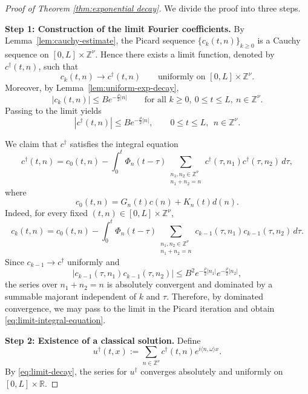 \documentclass[12pt,reqno,tbtags]{amsart}
\newcommand\1{\mathbbm{1}}
\begin{document}
\begin{proof}[Proof of Theorem \ref{thm:exponential decay}]
We divide the proof into three steps.

\medskip
\noindent
\textbf{Step 1: Construction of the limit Fourier coefficients.}
By Lemma~\ref{lem:cauchy-estimate}, the Picard sequence
$\{c_k(t,n)\}_{k\geq 0}$ is a Cauchy sequence on $[0,L]\times \mathbb{Z}^{\nu}$.
Hence there exists a limit function, denoted by $c^{\dagger}(t,n)$, such that
\[
c_k(t,n)\longrightarrow c^{\dagger}(t,n)
\qquad \text{uniformly on } [0,L]\times \mathbb{Z}^{\nu}.
\]
Moreover, by Lemma~\ref{lem:uniform-exp-decay},
\[
|c_k(t,n)|\leq B e^{-\frac{\rho}{2}|n|}
\qquad
\text{for all } k\geq 0,\ 0\leq t\leq L,\ n\in \mathbb{Z}^{\nu}.
\]
Passing to the limit yields
\begin{equation}\label{eq:limit-decay}
|c^{\dagger}(t,n)|\leq B e^{-\frac{\rho}{2}|n|},
\qquad
0\leq t\leq L,\ \ n\in \mathbb{Z}^{\nu}.
\end{equation}

We claim that $c^{\dagger}$ satisfies the integral equation
\begin{equation}\label{eq:limit-integral-equation}
c^{\dagger}(t,n)
=
c_0(t,n)
-
\int_0^t \Phi_n(t-\tau)
\sum_{\substack{n_1,n_2\in \mathbb{Z}^{\nu}\\ n_1+n_2=n}}
c^{\dagger}(\tau,n_1)c^{\dagger}(\tau,n_2)\,d\tau,
\end{equation}
where
\[
c_0(t,n)=G_n(t)c(n)+K_n(t)d(n).
\]
Indeed, for every fixed $(t,n)\in [0,L]\times \mathbb{Z}^{\nu}$,
\[
c_k(t,n)
=
c_0(t,n)
-
\int_0^t \Phi_n(t-\tau)
\sum_{\substack{n_1,n_2\in \mathbb{Z}^{\nu}\\ n_1+n_2=n}}
c_{k-1}(\tau,n_1)c_{k-1}(\tau,n_2)\,d\tau.
\]
Since $c_{k-1}\to c^{\dagger}$ uniformly and
\[
|c_{k-1}(\tau,n_1)c_{k-1}(\tau,n_2)|
\leq
B^2 e^{-\frac{\rho}{2}|n_1|}e^{-\frac{\rho}{2}|n_2|},
\]
the series over $n_1+n_2=n$ is absolutely convergent and dominated by a summable
majorant independent of $k$ and $\tau$. Therefore, by dominated convergence, we may
pass to the limit in the Picard iteration and obtain
\eqref{eq:limit-integral-equation}.

\medskip
\noindent
\textbf{Step 2: Existence of a classical solution.}
Define
\begin{equation*}
u^{\dagger}(t,x)
:=
\sum_{n\in \mathbb{Z}^{\nu}} c^{\dagger}(t,n)e^{i\langle n,\omega\rangle x}.
\end{equation*}
By \eqref{eq:limit-decay}, the series for $u^{\dagger}$ converges absolutely and
uniformly on $[0,L]\times \mathbb{R}$.


\end{proof}
\end{document}
